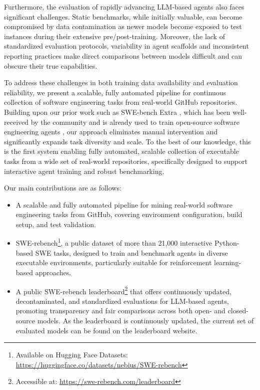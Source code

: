 \documentclass[dandb]{article}
\begin{document}
Furthermore, the evaluation of rapidly advancing LLM-based agents also faces significant challenges. Static benchmarks, while initially valuable, can become compromised by data contamination as newer models become exposed to test instances during their extensive pre/post-training. Moreover, the lack of standardized evaluation protocols, variability in agent scaffolds and inconsistent reporting practices make direct comparisons between models difficult and can obscure their true capabilities.

To address these challenges in both training data availability and evaluation reliability, we present a scalable, fully automated pipeline for continuous collection of software engineering tasks from real-world GitHub repositories. Building upon our prior work such as SWE-bench Extra \citep{badertdinov2024scaling}, which has been well-received by the community and is already used to train open-source software engineering agents \citep{wang2025swedev}, our approach eliminates manual intervention and significantly expands task diversity and scale. To the best of our knowledge, this is the first system enabling fully automated, scalable collection of executable tasks from a wide set of real-world repositories, specifically designed to support interactive agent training and robust benchmarking.

Our main contributions are as follows:

\begin{itemize}
    \item A scalable and fully automated pipeline for mining real-world software engineering tasks from GitHub, covering environment configuration, build setup, and test validation.
    \item SWE-rebench\footnote{Available on Hugging Face Datasets: \url{https://huggingface.co/datasets/nebius/SWE-rebench}}, a public dataset of more than 21,000 interactive Python-based SWE tasks, designed to train and benchmark agents in diverse executable environments, particularly suitable for reinforcement learning-based approaches.
    \item A public SWE-rebench leaderboard\footnote{Accessible at: \url{https://swe-rebench.com/leaderboard}} that offers continuously updated, decontaminated, and standardized evaluations for LLM-based agents, promoting transparency and fair comparisons across both open- and closed-source models. As the leaderboard is continuously updated, the current set of evaluated models can be found on the leaderboard website.
\end{itemize}
\end{document}
